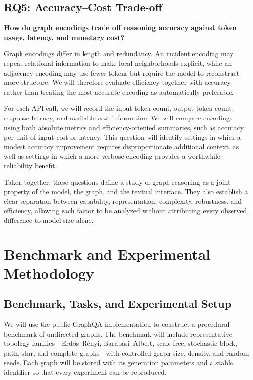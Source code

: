 \documentclass[11pt,a4paper]{article}
\begin{document}
\subsection{RQ5: Accuracy–Cost Trade-off}

\textbf{How do graph encodings trade off reasoning accuracy against token usage, latency, and monetary cost?}

Graph encodings differ in length and redundancy. An incident encoding may repeat relational information to make local neighborhoods explicit, while an adjacency encoding may use fewer tokens but require the model to reconstruct more structure. We will therefore evaluate efficiency together with accuracy rather than treating the most accurate encoding as automatically preferable.

For each API call, we will record the input token count, output token count, response latency, and available cost information. We will compare encodings using both absolute metrics and efficiency-oriented summaries, such as accuracy per unit of input cost or latency. This question will identify settings in which a modest accuracy improvement requires disproportionate additional context, as well as settings in which a more verbose encoding provides a worthwhile reliability benefit.

Taken together, these questions define a study of graph reasoning as a joint property of the model, the graph, and the textual interface. They also establish a clear separation between capability, representation, complexity, robustness, and efficiency, allowing each factor to be analyzed without attributing every observed difference to model size alone.

\section{Benchmark and Experimental Methodology}

\subsection{Benchmark, Tasks, and Experimental Setup}

We will use the public GraphQA implementation to construct a procedural benchmark of undirected graphs. The benchmark will include representative topology families—Erdős–Rényi, Barabási–Albert, scale-free, stochastic block, path, star, and complete graphs—with controlled graph size, density, and random seeds. Each graph will be stored with its generation parameters and a stable identifier so that every experiment can be reproduced.
\end{document}
